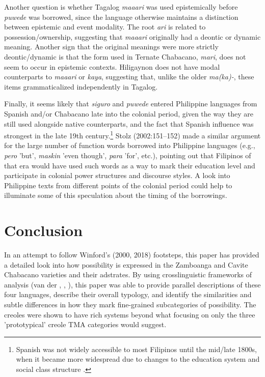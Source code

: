 \documentclass[output=paper]{langsci/langscibook}
\begin{document}
Another question is whether Tagalog \textit{maaari} was used epistemically before \textit{puwede} was borrowed, since the language otherwise maintains a distinction between epistemic and event modality. The root \textit{ari} is related to possession/ownership, suggesting that \textit{maaari} originally had a deontic or dynamic meaning. Another sign that the original meanings were more strictly deontic/dynamic is that the form used in Ternate Chabacano, \textit{mari}, does not seem to occur in epistemic contexts. Hiligaynon does not have modal counterparts to \textit{maaari} or \textit{kaya}, suggesting that, unlike the older \textit{ma(ka)-}, these items grammaticalized independently in Tagalog. 

Finally, it seems likely that \textit{siguro} and \textit{puwede} entered Philippine languages from Spanish and/or Chabacano late into the colonial period, given the way they are still used alongside native counterparts, and the fact that Spanish influence was strongest in the late 19th century.\footnote{Spanish was not widely accessible to most Filipinos until the mid/late 1800s, when it became more widespread due to changes to the education system and social class structure \citep[5]{Lesho2018}.}  Stolz (2002:151–152) made a similar argument for the large number of function words borrowed into Philippine languages (e.g., \textit{pero} 'but', \textit{maskin} 'even though', \textit{para} 'for', etc.), pointing out that Filipinos of that era would have used such words as a way to mark their education level and participate in colonial power structures and discourse styles. A look into Philippine texts from different points of the colonial period could help to illuminate some of this speculation about the timing of the borrowings.

\section{Conclusion}

In an attempt to follow Winford's (2000, 2018) footsteps, this paper has provided a detailed look into how possibility is expressed in the Zamboanga and Cavite Chabacano varieties and their adstrates. By using crosslinguistic frameworks of analysis (van der \citealt{AuweraPlungian1998}, \citealt{Palmer2001}, \citealt{MatthewsonEtAl2005}), this paper was able to provide parallel descriptions of these four languages, describe their overall typology, and identify the similarities and subtle differences in how they mark fine-grained subcategories of possibility. The creoles were shown to have rich systems beyond what focusing on only the three 'prototypical' creole TMA categories would suggest. 
\end{document}
